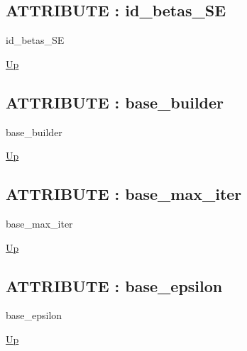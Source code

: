 \par
\par
\subsection*{ATTRIBUTE : id\_betas\_SE}
\hypertarget{ecldoc:logisticregression.constants.id_betas_se}{}
\begin{minipage}[t]{\textwidth}
\begin{flushleft}
 id\_betas\_SE 
\end{flushleft}
\end{minipage}
\hyperlink{ecldoc:LogisticRegression.Constants}{Up}

\par
\par
\subsection*{ATTRIBUTE : base\_builder}
\hypertarget{ecldoc:logisticregression.constants.base_builder}{}
\begin{minipage}[t]{\textwidth}
\begin{flushleft}
 base\_builder 
\end{flushleft}
\end{minipage}
\hyperlink{ecldoc:LogisticRegression.Constants}{Up}

\par
\par
\subsection*{ATTRIBUTE : base\_max\_iter}
\hypertarget{ecldoc:logisticregression.constants.base_max_iter}{}
\begin{minipage}[t]{\textwidth}
\begin{flushleft}
 base\_max\_iter 
\end{flushleft}
\end{minipage}
\hyperlink{ecldoc:LogisticRegression.Constants}{Up}

\par
\par
\subsection*{ATTRIBUTE : base\_epsilon}
\hypertarget{ecldoc:logisticregression.constants.base_epsilon}{}
\begin{minipage}[t]{\textwidth}
\begin{flushleft}
 base\_epsilon 
\end{flushleft}
\end{minipage}
\hyperlink{ecldoc:LogisticRegression.Constants}{Up}

